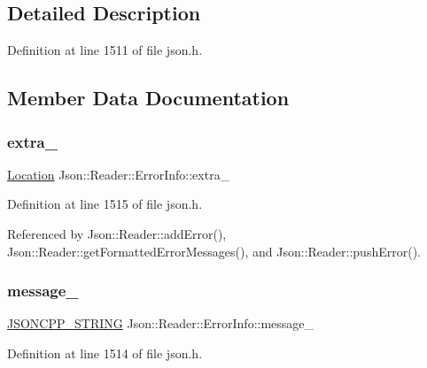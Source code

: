\subsection{Detailed Description}


Definition at line 1511 of file json.\+h.



\subsection{Member Data Documentation}
\mbox{\label{class_json_1_1_reader_1_1_error_info_af92c24acf642b040d6e40aac4952d44d}} 
\subsubsection{\texorpdfstring{extra\+\_\+}{extra\_}}
{\footnotesize\ttfamily \hyperlink{class_json_1_1_reader_a46795b5b272bf79a7730e406cb96375a}{Location} Json\+::\+Reader\+::\+Error\+Info\+::extra\+\_\+}



Definition at line 1515 of file json.\+h.



Referenced by Json\+::\+Reader\+::add\+Error(), Json\+::\+Reader\+::get\+Formatted\+Error\+Messages(), and Json\+::\+Reader\+::push\+Error().

\mbox{\label{class_json_1_1_reader_1_1_error_info_a3529d420f7c83165565bf294a5d6ed13}} 
\subsubsection{\texorpdfstring{message\+\_\+}{message\_}}
{\footnotesize\ttfamily \hyperlink{json_8h_a1e723f95759de062585bc4a8fd3fa4be}{J\+S\+O\+N\+C\+P\+P\+\_\+\+S\+T\+R\+I\+NG} Json\+::\+Reader\+::\+Error\+Info\+::message\+\_\+}



Definition at line 1514 of file json.\+h.



